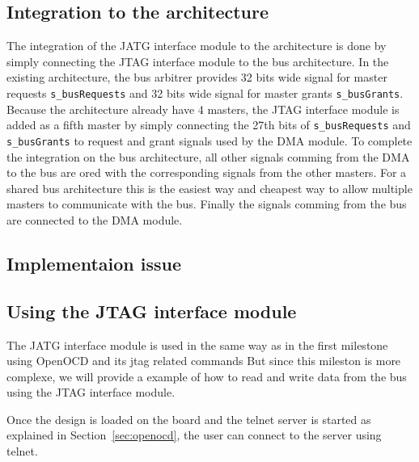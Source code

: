 \documentclass[a4paper,11pt,oneside]{report}
\begin{document}
\subsection{Integration to the architecture}

The integration of the JATG interface module to the architecture is done by simply connecting the JTAG interface module to the bus architecture.
In the existing architecture, the bus arbitrer provides 32 bits wide signal for master requests \texttt{s\_busRequests} and 32 bits wide signal for master grants \texttt{s\_busGrants}.
Because the architecture already have 4 masters, the JTAG interface module is added as a fifth master by simply connecting the 27th bits of \texttt{s\_busRequests} and \texttt{s\_busGrants} 
to request and grant signals used by the DMA module.
To complete the integration on the bus architecture, all other signals comming from the DMA to the bus are ored with the corresponding signals from the other masters. For 
a shared bus architecture this is the easiest way and cheapest way to allow multiple masters to communicate with the bus.
Finally the signals comming from the bus are connected to the DMA module.

\subsection{Implementaion issue}


\subsection{Using the JTAG interface module}

The JATG interface module is used in the same way as in the first milestone using OpenOCD and its jtag related commands
But since this mileston is more complexe, we will provide a example of how to read and write data from the bus using the JTAG interface module.

Once the design is loaded on the board and the telnet server is started as explained in Section~\ref{sec:openocd}, the user can connect to the server using telnet.
\end{document}
